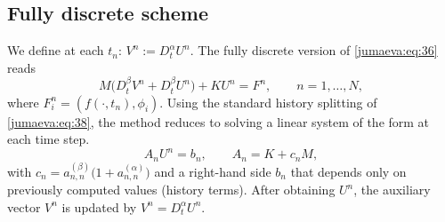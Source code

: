 \documentclass{amsart}
\numberwithin{equation}{section}
\begin{document}
\subsection{Fully discrete scheme}
 We define at each $t_n$:
$ V^n := D_t^\alpha U^n.$
The fully discrete version of \eqref{jumaeva:eq:36} reads
\begin{equation}
M\big(D_t^\beta V^n + D_t^\beta U^n\big) + K U^n = F^n,\qquad n=1,\dots,N,\label{jumaeva:eq:39}
\end{equation}
where $F^n_i=(f(\cdot,t_n),\phi_i)$.
Using the standard history splitting of \eqref{jumaeva:eq:38}, the method reduces to solving a linear system of the form at each time step.
\begin{equation*}
A_n U^n = b_n,\qquad A_n = K + c_n M,
\end{equation*}
with $c_n=a^{(\beta)}_{n,n}\big(1+a^{(\alpha)}_{n,n}\big)$ and a right-hand side $b_n$ that depends only on previously computed values (history terms). After obtaining $U^n$, the auxiliary vector $V^n$ is updated by $V^n=D_t^\alpha U^n$.
\end{document}
